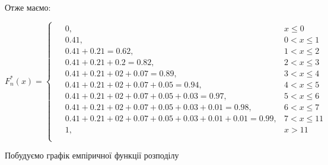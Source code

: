 \documentclass[a5paper, 20pt]{article}
\begin{document}
Отже маємо:

\vspace{4mm}

$
F_n^*(x) =
\begin{cases}
\begin{aligned}
&0,  \qquad & x \leqslant 0 \\
&0.41,  &0 < x \leqslant 1\\
&0.41 + 0.21 = 0.62, & 1 < x \leqslant 2\\
&0.41 + 0.21 + 0.2 = 0.82, & 2 < x \leqslant 3\\
&0.41 + 0.21 + 02 + 0.07 = 0.89, & 3 < x \leqslant 4\\
&0.41 + 0.21 + 02 + 0.07 + 0.05 = 0.94, & 4 < x \leqslant 5\\
&0.41 + 0.21 + 02 + 0.07 + 0.05  + 0.03 = 0.97, & 5 < x \leqslant 6\\
&0.41 + 0.21 + 02 + 0.07 + 0.05  + 0.03 + 0.01 = 0.98, & 6 < x \leqslant 7\\
&0.41 + 0.21 + 02 + 0.07 + 0.05  + 0.03 + 0.01  + 0.01 = 0.99, & 7 < x \leqslant 11\\
&1 , &x > 11\\
\end{aligned}
\end{cases}
$

\vspace{4mm}




\hypertarget{dfunc}{Побудуємо графік емпіричної функції розподілу}

\vspace{4mm}
\end{document}
